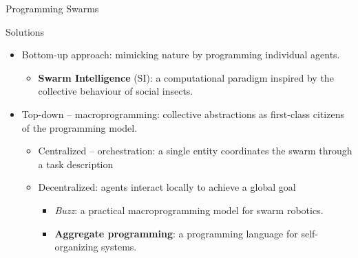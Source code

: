 \documentclass[aspectratio=169]{beamer}
\begin{document}
	\begin{frame}{Programming Swarms}
		\begin{exampleblock}{Solutions}
			\begin{itemize}
					\item Bottom-up approach: mimicking nature by programming individual agents.
					\begin{itemize}
						\item \textbf{Swarm Intelligence} (SI): a computational paradigm inspired by the collective behaviour of social insects.
					\end{itemize}
					\item Top-down -- macroprogramming: collective abstractions as first-class citizens of the programming model.
					\begin{itemize}
						\item \alert{Centralized -- orchestration}: a single entity coordinates the swarm through a task description
						\item \alert{Decentralized}: agents interact locally to achieve a global goal
						\begin{itemize}
							\item \emph{Buzz}: a practical macroprogramming model for swarm robotics.
							\item \textbf{Aggregate programming}: a programming language for self-organizing systems.
						\end{itemize}
					\end{itemize}
			\end{itemize}
		\end{exampleblock}
	\end{frame}
\end{document}

